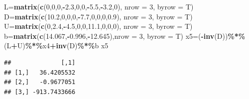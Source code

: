 \documentclass[
]{article}
\newenvironment{Shaded}{\begin{snugshade}}{\end{snugshade}}
\newcommand{\AttributeTok}[1]{\textcolor[rgb]{0.13,0.29,0.53}{#1}}
\newcommand{\DecValTok}[1]{\textcolor[rgb]{0.00,0.00,0.81}{#1}}
\newcommand{\FloatTok}[1]{\textcolor[rgb]{0.00,0.00,0.81}{#1}}
\newcommand{\FunctionTok}[1]{\textcolor[rgb]{0.13,0.29,0.53}{\textbf{#1}}}
\newcommand{\NormalTok}[1]{#1}
\newcommand{\OtherTok}[1]{\textcolor[rgb]{0.56,0.35,0.01}{#1}}
\newcommand{\SpecialCharTok}[1]{\textcolor[rgb]{0.81,0.36,0.00}{\textbf{#1}}}
\begin{document}
\begin{Shaded}
\begin{Highlighting}[]
\NormalTok{  L}\OtherTok{=}\FunctionTok{matrix}\NormalTok{(}\FunctionTok{c}\NormalTok{(}\DecValTok{0}\NormalTok{,}\DecValTok{0}\NormalTok{,}\DecValTok{0}\NormalTok{,}\SpecialCharTok{{-}}\FloatTok{2.3}\NormalTok{,}\DecValTok{0}\NormalTok{,}\DecValTok{0}\NormalTok{,}\SpecialCharTok{{-}}\FloatTok{5.5}\NormalTok{,}\SpecialCharTok{{-}}\FloatTok{3.2}\NormalTok{,}\DecValTok{0}\NormalTok{), }\AttributeTok{nrow =} \DecValTok{3}\NormalTok{, }\AttributeTok{byrow =}\NormalTok{ T)}
\NormalTok{  D}\OtherTok{=}\FunctionTok{matrix}\NormalTok{(}\FunctionTok{c}\NormalTok{(}\FloatTok{10.2}\NormalTok{,}\DecValTok{0}\NormalTok{,}\DecValTok{0}\NormalTok{,}\DecValTok{0}\NormalTok{,}\SpecialCharTok{{-}}\FloatTok{7.7}\NormalTok{,}\DecValTok{0}\NormalTok{,}\DecValTok{0}\NormalTok{,}\DecValTok{0}\NormalTok{,}\FloatTok{0.9}\NormalTok{), }\AttributeTok{nrow =} \DecValTok{3}\NormalTok{, }\AttributeTok{byrow =}\NormalTok{ T)}
\NormalTok{  U}\OtherTok{=}\FunctionTok{matrix}\NormalTok{(}\FunctionTok{c}\NormalTok{(}\DecValTok{0}\NormalTok{,}\FloatTok{2.4}\NormalTok{,}\SpecialCharTok{{-}}\FloatTok{4.5}\NormalTok{,}\DecValTok{0}\NormalTok{,}\DecValTok{0}\NormalTok{,}\FloatTok{11.1}\NormalTok{,}\DecValTok{0}\NormalTok{,}\DecValTok{0}\NormalTok{,}\DecValTok{0}\NormalTok{), }\AttributeTok{nrow =} \DecValTok{3}\NormalTok{, }\AttributeTok{byrow =}\NormalTok{ T)}
\NormalTok{  b}\OtherTok{=}\FunctionTok{matrix}\NormalTok{(}\FunctionTok{c}\NormalTok{(}\FloatTok{14.067}\NormalTok{,}\SpecialCharTok{{-}}\FloatTok{0.996}\NormalTok{,}\SpecialCharTok{{-}}\FloatTok{12.645}\NormalTok{),}\AttributeTok{nrow =} \DecValTok{3}\NormalTok{, }\AttributeTok{byrow =}\NormalTok{ T)}
\NormalTok{  x5}\OtherTok{=}\NormalTok{(}\SpecialCharTok{{-}}\FunctionTok{inv}\NormalTok{(D))}\SpecialCharTok{\%*\%}\NormalTok{(L}\SpecialCharTok{+}\NormalTok{U)}\SpecialCharTok{\%*\%}\NormalTok{x4}\SpecialCharTok{+}\FunctionTok{inv}\NormalTok{(D)}\SpecialCharTok{\%*\%}\NormalTok{b}
\NormalTok{  x5}
\end{Highlighting}
\end{Shaded}

\begin{verbatim}
##              [,1]
## [1,]   36.4205532
## [2,]   -0.9677051
## [3,] -913.7433666
\end{verbatim}
\end{document}

